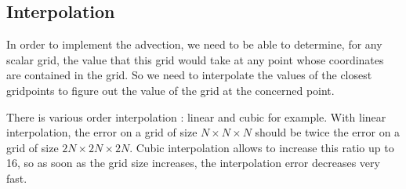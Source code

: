 \documentclass[accepted,single]{gipaper}
\begin{document}
\subsection{Interpolation}


In order to implement the advection, we need to be able to determine, for any scalar grid, the value that this grid would take at any point whose coordinates are contained in the grid. So we need to interpolate the values of the closest gridpoints to figure out the value of the grid at the concerned point. 

There is various order interpolation : linear and cubic for example. With linear interpolation, the error on a grid of size $N \times N \times N$ should be twice the error on a grid of size $2N \times 2N \times 2N$. Cubic interpolation allows to increase this ratio up to 16, so as soon as the grid size increases, the interpolation error decreases very fast.
\end{document}
